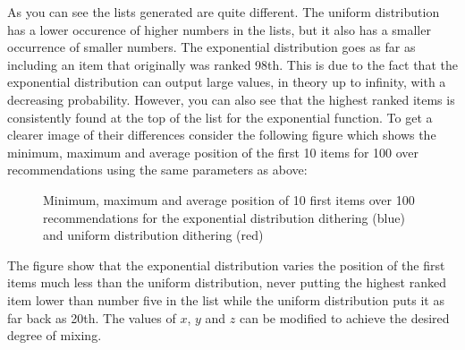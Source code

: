 As you can see the lists generated are quite different. The uniform distribution has a lower occurence of higher
numbers in the lists, but it also has a smaller occurrence of smaller numbers. The exponential distribution
goes as far as including an item that originally was ranked 98th. This is due to the fact that the exponential
distribution can output large values, in theory up to infinity, with a decreasing probability.
However, you can also see that the highest ranked items is consistently found at the top of the list
for the exponential function.
To get a clearer image of their differences consider the following figure which shows the minimum, maximum and average position of
the first 10 items for 100 over recommendations using the same parameters as above:



\begin{figure}[H]
	\label{fig:minmaxuniform}
	\centering
	\caption[Average position of recommendations with dithering]{Minimum, maximum and average position of 10 first items over 100 recommendations for the exponential distribution dithering (blue) and uniform distribution dithering (red)}

\end{figure}

The figure show that the exponential distribution varies the position of the first items much less
than the uniform distribution, never putting the highest ranked item lower than number five in the
list while the uniform distribution puts it as far back as 20th. The values of $x$, $y$ and $z$ can be modified to
achieve the desired degree of mixing.

